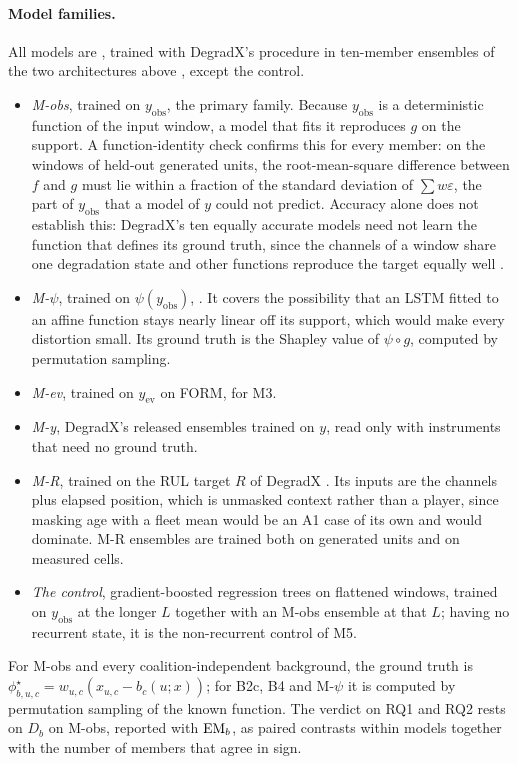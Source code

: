 \documentclass{article}
\begin{document}
\paragraph{Model families.} All models are , trained with DegradX's procedure in ten-member ensembles of the two architectures above \citep{degradxrepo}, except the control.
\begin{itemize}
\item \emph{M-obs}, trained on $y_{\mathrm{obs}}$, the primary family. Because $y_{\mathrm{obs}}$ is a deterministic function of the input window, a model that fits it reproduces $g$ on the support. A function-identity check confirms this for every member: on the windows of held-out generated units, the root-mean-square difference between $f$ and $g$ must lie within a fraction  of the standard deviation of $\sum w\varepsilon$, the part of $y_{\mathrm{obs}}$ that a model of $y$ could not predict. Accuracy alone does not establish this: DegradX's ten equally accurate models need not learn the function that defines its ground truth, since the channels of a window share one degradation state and other functions reproduce the target equally well \citep{degradx2026}.
\item \emph{M-$\psi$}, trained on $\psi(y_{\mathrm{obs}})$, . It covers the possibility that an LSTM fitted to an affine function stays nearly linear off its support, which would make every distortion small. Its ground truth is the Shapley value of $\psi\circ g$, computed by permutation sampling.
\item \emph{M-ev}, trained on $y_{\mathrm{ev}}$ on FORM, for M3.
\item \emph{M-y}, DegradX's released ensembles trained on $y$, read only with instruments that need no ground truth.
\item \emph{M-R}, trained on the RUL target $R$ of DegradX \citep{degradx2026}. Its inputs are the channels plus elapsed position, which is unmasked context rather than a player, since masking age with a fleet mean would be an A1 case of its own and would dominate. M-R ensembles are trained both on generated units and on measured cells.
\item \emph{The control}, gradient-boosted regression trees \citep{friedman2001greedy} on flattened windows, trained on $y_{\mathrm{obs}}$ at the longer $L$ together with an M-obs ensemble at that $L$; having no recurrent state, it is the non-recurrent control of M5.
\end{itemize}
For M-obs and every coalition-independent background, the ground truth is $\phi^\star_{b,u,c} = w_{u,c}(x_{u,c}-b_c(u;x))$; for B2c, B4 and M-$\psi$ it is computed by permutation sampling of the known function. The verdict on RQ1 and RQ2 rests on $D_b$ on M-obs, reported with $\mathrm{EM}_b$, as paired contrasts within models together with the number of members that agree in sign.
\end{document}
